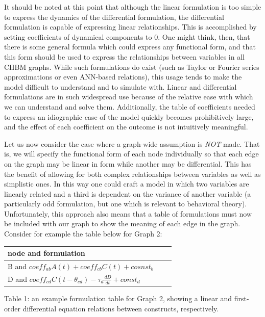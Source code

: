 \documentclass[runningheads,a4paper]{llncs}
\begin{document}
It should be noted at this point that although the linear formulation is too simple to express the dynamics of the differential formulation, the differential formulation is capable of expressing linear relationships.
This is accomplished by setting coefficients of dynamical components to 0.
One might think, then, that there is some general formula which could express any functional form, and that this form should be used to express the relationships between variables in all CHBM graphs.
While such formulations do exist (such as Taylor or Fourier series approximations or even ANN-based relations), this usage tends to make the model difficult to understand and to simulate with.
Linear and differential formulations are in such widespread use because of the relative ease with which we can understand and solve them. 
Additionally, the table of coefficients needed to express an idiographic case of the model quickly becomes prohibitively large, and the effect of each coefficient on the outcome is not intuitively meaningful.

Let us now consider the case where a graph-wide assumption is \emph{NOT} made.
That is, we will specify the functional form of each node individually so that each edge on the graph may be linear in form while another may be differential.
This has the benefit of allowing for both complex relationships between variables as well as simplistic ones.
In this way one could craft a model in which two variables are linearly related and a third is dependent on the variance of another variable (a particularly odd formulation, but one which is relevant to behavioral theory).
Unfortunately, this approach also means that a table of formulations must now be included with our graph to show the meaning of each edge in the graph.
Consider for example the table below for Graph 2:

\begin{centering}
  \begin{tabular}{ | l | l | l |}
      \hline
      node and formulation \\ \hline
      B and $coeff_{ab}A(t) + coeff_{cb}C(t) + cosnst_b$  \\ \hline
      D and $coeff_{cd}C(t-\theta_{cd}) - \tau_{d}\frac{dD}{dt} + const_d$ \\ \hline
  \end{tabular}
  
  Table 1: an example formulation table for Graph 2, showing a linear and first-order differential equation relations between constructs, respectively.
\end{centering}
\end{document}
